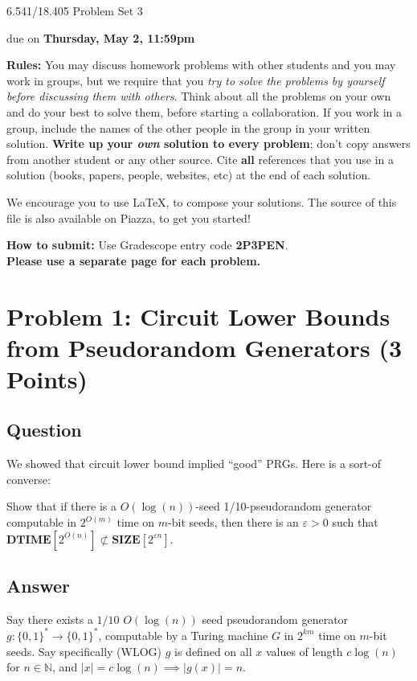 \documentclass{article}
\newcommand{\DTIME}{\mathbf{DTIME}}
\newcommand{\SIZE}{\mathbf{SIZE}}
\def \eps {{\varepsilon}}
\begin{document}
	
	
	\begin{center}
		\Large
		6.541/18.405 Problem Set 3
		
		\vspace{3pt}
		\normalsize
		due on {\bf Thursday, May 2, 11:59pm}
	\end{center}
	
	{\bf Rules:} You may discuss homework problems with other students and you may work in groups, but we require that you {\em try to solve the problems by yourself before discussing them with others}. Think about all the problems on your own and do your best to solve them, before starting a collaboration. If you work in a group, include the names of the other people in the group in your written solution. {\bf Write up your {\em own} solution to every problem}; don't copy answers from another student or any other source. Cite {\bf all} references that you use in a solution (books, papers, people, websites, etc) at the end of each solution. 
	
	We encourage you to use \LaTeX, to compose your solutions. The source of this file is also available on Piazza, to get you started!
	
	{\bf How to submit:} Use Gradescope entry code \textbf{2P3PEN}.\\ \textbf{\large Please use a separate page for each problem.} 

\section*{Problem 1: Circuit Lower Bounds from Pseudorandom Generators (3 Points)}

\subsection*{Question}
We showed that circuit lower bound implied ``good'' PRGs. Here is a sort-of converse:

Show that if there is a $O(\log(n))$-seed 1/10-pseudorandom generator computable in $2^{O(m)}$ time on $m$-bit seeds, then there is an $\eps>0$ such that $\DTIME[2^{O(n)}]\not\subset\SIZE[2^{\eps n}]$.

\subsection*{Answer}

Say there exists a $1/10$ $O(\log(n))$ seed pseudorandom generator $g : \{0, 1\}^* \to \{0, 1\}^*$, computable by a Turing machine $G$ in $2^{km}$ time on $m$-bit seeds.
Say specifically (WLOG) $g$ is defined on all $x$ values of length $c \log(n)$ for $n \in \mathbb{N}$, and $|x| = c \log(n) \implies |g(x)| = n$.
\end{document}
